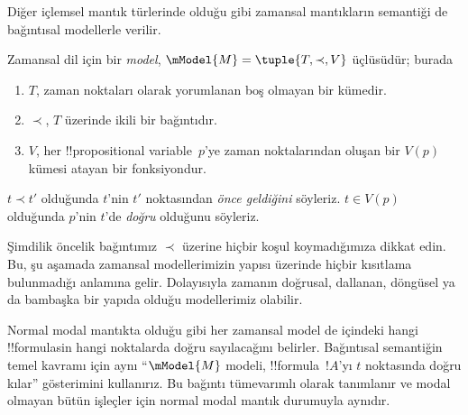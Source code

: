 \documentclass[../../../include/open-logic-section]{subfiles}
\begin{document}
Diğer içlemsel mantık türlerinde olduğu gibi zamansal mantıkların semantiği
de bağıntısal modellerle verilir.

\begin{defn}
  Zamansal dil için bir \emph{model}, $\mModel{M}=\tuple{T,\prec,V}$
  üçlüsüdür; burada
  \begin{enumerate}
  \item $T$, zaman noktaları olarak yorumlanan boş olmayan bir kümedir.
  \item $\prec$, $T$ üzerinde ikili bir bağıntıdır.
  \item $V$, her !!{propositional variable}~$p$'ye zaman noktalarından oluşan
    bir $V(p)$ kümesi atayan bir fonksiyondur.
  \end{enumerate}
  $t\prec t'$ olduğunda $t$'nin $t'$ noktasından \emph{önce geldiğini} söyleriz.
  $t\in V(p)$ olduğunda $p$'nin $t$'de \emph{doğru} olduğunu söyleriz.
\end{defn}

Şimdilik öncelik bağıntımız $\prec$ üzerine hiçbir koşul koymadığımıza
dikkat edin. Bu, şu aşamada zamansal modellerimizin yapısı üzerinde hiçbir
kısıtlama bulunmadığı anlamına gelir. Dolayısıyla zamanın doğrusal,
dallanan, döngüsel ya da bambaşka bir yapıda olduğu modellerimiz olabilir.

Normal modal mantıkta olduğu gibi her zamansal model de içindeki hangi
!!{formula}s{}in hangi noktalarda doğru sayılacağını belirler. Bağıntısal
semantiğin temel kavramı için aynı ``$\mModel{M}$ modeli, !!{formula}~$!A$'yı
$t$ noktasında doğru kılar'' gösterimini kullanırız. Bu bağıntı tümevarımlı
olarak tanımlanır ve modal olmayan bütün işleçler için normal modal mantık
durumuyla aynıdır.
\end{document}
